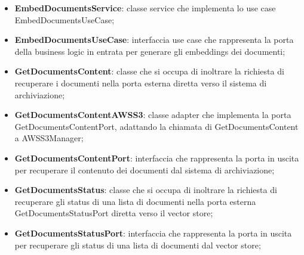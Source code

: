 \documentclass[10pt, a4paper]{article}
\begin{document}
\begin{itemize}
    \item \label{EmbedDocumentsService}\textbf{EmbedDocumentsService}: classe service che implementa lo use case EmbedDocumentsUseCase;
    \item \label{EmbedDocumentsUseCase}\textbf{EmbedDocumentsUseCase}: interfaccia use case che rappresenta la porta della business logic in entrata per generare gli embeddings dei documenti;    
    \item \label{GetDocumentsContent}\textbf{GetDocumentsContent}: classe che si occupa di inoltrare la richiesta di recuperare i documenti nella porta esterna diretta verso il sistema di archiviazione;
    
    \item \label{GetDocumentsContentAWSS3}\textbf{GetDocumentsContentAWSS3}: classe adapter che implementa la porta GetDocumentsContentPort, adattando la chiamata di GetDocumentsContent a AWSS3Manager;
    \item \label{GetDocumentsContentPort}\textbf{GetDocumentsContentPort}: interfaccia che rappresenta la porta in uscita per recuperare il contenuto dei documenti dal sistema di archiviazione;
    \item \label{GetDocumentsStatus}\textbf{GetDocumentsStatus}: classe che si occupa di inoltrare la richiesta di recuperare gli status di una lista di documenti nella porta esterna GetDocumentsStatusPort diretta verso il vector store;
    \item  \label{GetDocumentsStatusPort}\textbf{GetDocumentsStatusPort}: interfaccia che rappresenta la porta in uscita per recuperare gli status di una lista di documenti dal vector store;
    

\end{itemize}
\end{document}
